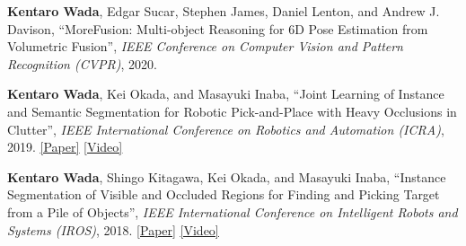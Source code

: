 \documentclass[letterpaper,MMMyyyy,nonstop]{simpleresumecv}
\begin{document}
\begin{body}
\textbf{Kentaro Wada}, Edgar Sucar, Stephen James, Daniel Lenton, and Andrew J.
Davison,
``MoreFusion: Multi-object Reasoning for 6D Pose Estimation from Volumetric
Fusion'',
\textit{IEEE Conference on Computer Vision and Pattern Recognition (CVPR)}, 2020.

\textbf{Kentaro Wada}, Kei Okada, and Masayuki Inaba,
``Joint Learning of Instance and Semantic Segmentation for Robotic Pick-and-Place with Heavy Occlusions in Clutter'',
\textit{IEEE International Conference on Robotics and Automation (ICRA)}, 2019.
\href{https://arxiv.org/abs/2001.07481}{\underline{[Paper]}}
\href{https://www.youtube.com/watch?v=bRTI0whWkq8}{\underline{[Video]}}

\GapNoBreak


\GapNoBreak

\textbf{Kentaro Wada}, Shingo Kitagawa, Kei Okada, and Masayuki Inaba,
``Instance Segmentation of Visible and Occluded Regions for Finding and Picking Target from a Pile of Objects'',
\textit{IEEE International Conference on Intelligent Robots and Systems (IROS)}, 2018.
\href{https://arxiv.org/abs/2001.07475}{\underline{[Paper]}}
\href{https://www.youtube.com/watch?v=tNLtXb04i3w}{\underline{[Video]}}


\end{body}
\end{document}
